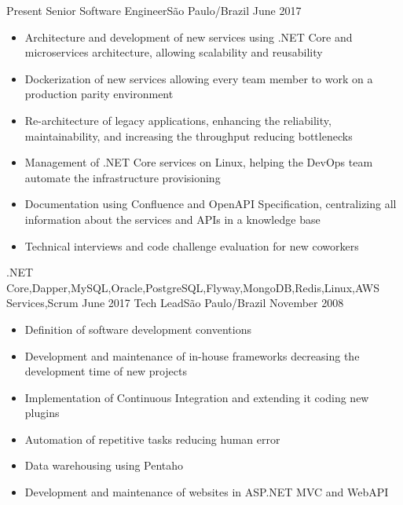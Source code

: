 
\begin{experiences}
  \experience
    {Present}   {Senior Software Engineer}{}{São Paulo/Brazil}
    {June 2017} {
                  \begin{itemize}
                    \item Architecture and development of new services using .NET Core and microservices architecture, allowing scalability and reusability 
                    \item Dockerization of new services allowing every team member to work on a production parity environment  
                    \item Re-architecture of legacy applications, enhancing the reliability, maintainability, and increasing the throughput reducing bottlenecks   
                    \item Management of .NET Core services on Linux, helping the DevOps team automate the infrastructure provisioning
                    \item Documentation using Confluence and OpenAPI Specification, centralizing all information about the services and APIs in a knowledge base 
                    \item Technical interviews and code challenge evaluation for new coworkers
                  \end{itemize}
                }
                {.NET Core,Dapper,MySQL,Oracle,PostgreSQL,Flyway,MongoDB,Redis,Linux,AWS Services,Scrum}
  \emptySeparator
  \experience
    {June 2017}     {Tech Lead}{}{São Paulo/Brazil}
    {November 2008} {
                      \begin{itemize}
                        \item Definition of software development conventions
                        \item Development and maintenance of in-house frameworks decreasing the development time of new projects
                        \item Implementation of Continuous Integration and extending it coding new plugins
                        \item Automation of repetitive tasks reducing human error
                        \item Data warehousing using Pentaho
                        \item Development and maintenance of websites in ASP.NET MVC and WebAPI

\end{itemize}}
\end{experiences}
